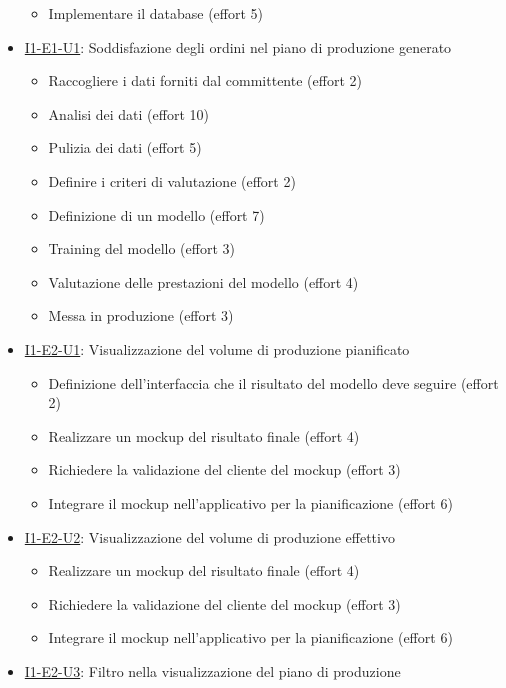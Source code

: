 \begin{itemize}
\begin{itemize}
          \item Implementare il database (effort 5)
        \end{itemize}
  \item \href{}{I1-E1-U1}: Soddisfazione degli ordini nel piano di produzione generato
        \begin{itemize}
          \item Raccogliere i dati forniti dal committente (effort 2)
          \item Analisi dei dati (effort 10)
          \item Pulizia dei dati (effort 5)
          \item Definire i criteri di valutazione (effort 2)
          \item Definizione di un modello (effort 7)
          \item Training del modello (effort 3)
          \item Valutazione delle prestazioni del modello (effort 4)
          \item Messa in produzione (effort 3)
        \end{itemize}
  \item \href{}{I1-E2-U1}: Visualizzazione del volume di produzione pianificato
        \begin{itemize}
          \item Definizione dell'interfaccia che il risultato del modello deve seguire (effort 2)
          \item Realizzare un mockup del risultato finale (effort 4)
          \item Richiedere la validazione del cliente del mockup (effort 3)
          \item Integrare il mockup nell'applicativo per la pianificazione (effort 6)
        \end{itemize}
  \item \href{}{I1-E2-U2}: Visualizzazione del volume di produzione effettivo
        \begin{itemize}
          \item Realizzare un mockup del risultato finale (effort 4)
          \item Richiedere la validazione del cliente del mockup (effort 3)
          \item Integrare il mockup nell'applicativo per la pianificazione (effort 6)
        \end{itemize}
  \item \href{}{I1-E2-U3}: Filtro nella visualizzazione del piano di produzione

\end{itemize}
